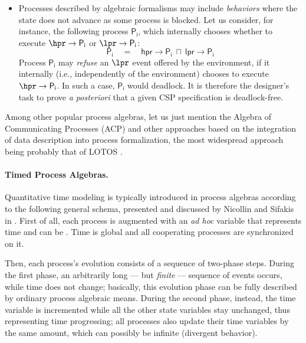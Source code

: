 \begin{itemize}
\item Processes described by algebraic formalisms may include  \emph{behaviors}
where the state does not advance as some process is blocked. 
Let us consider, for instance, the following process $\mathsf{P_i}$, 
which internally chooses whether to execute $\hpr \rightarrow \mathsf{P_i}$ or $\lpr \rightarrow \mathsf{P_i}$:
\begin{equation*}
  \mathsf{P_i} \quad  =   \quad  \mathsf{hpr} \longrightarrow \mathsf{P_i} \ \sqcap\  \mathsf{lpr} \longrightarrow \mathsf{P_i}
\end{equation*}
Process $\mathsf{P_i}$ may \emph{refuse} an $\lpr$ event offered by 
the environment, if it internally (i.e., independently of the 
environment) chooses to execute $\hpr \rightarrow \mathsf{P_i}$. In such a 
case, $\mathsf{P_i}$ would deadlock. It is therefore the designer's 
task to prove \emph{a posteriori} that a given CSP specification 
is deadlock-free.
\end{itemize}

Among other popular process algebras, let us just mention the 
Algebra of Communicating Processes (ACP) \cite{BW90} and other approaches 
based on the integration of data description into process formalization, 
the most widespread approach being probably that of LOTOS \cite{vEVD89,Bri89}.


\paragraph{Timed Process Algebras.}
Quantitative time modeling is typically introduced in process 
algebras according to the following general schema, presented 
and discussed by Nicollin and Sifakis in \cite{NS91}. First of all, 
each process is augmented with an \emph{ad hoc} variable that  
represents time and can be . Time is global and all cooperating processes 
are synchronized on it. 

Then, each process's evolution consists of a sequence of two-phase 
steps. During the first phase, an arbitrarily long --- but \emph{finite} 
--- sequence of events occurs, while time does not change; basically, 
this evolution phase can be fully described by ordinary process 
algebraic means. During the second phase, instead, the time variable 
is incremented while all the other state variables stay unchanged, 
thus representing time progressing; all processes also  
update their time variables by the same amount, which can possibly 
be infinite (divergent behavior).


